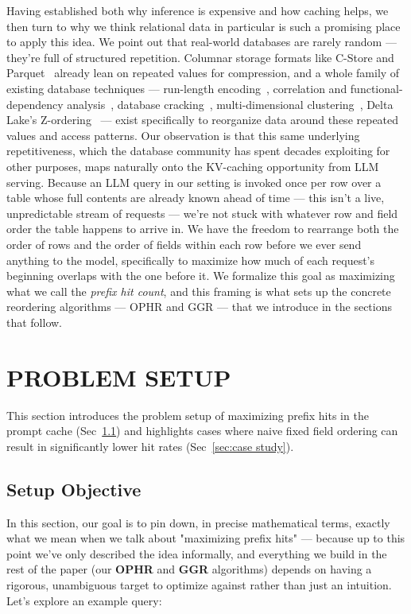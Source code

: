 \documentclass[manuscript,review]{acmart}
\begin{document}
Having established both why inference is expensive and how caching helps, we then turn to why we think relational data in particular is such a promising place to apply this idea. We point out that real-world databases are rarely random — they're full of structured repetition. Columnar storage formats like C-Store and Parquet~\cite{stonebraker2018cstore} already lean on repeated values for compression, and a whole family of existing database techniques — run-length encoding~\cite{lemire2011reordering}, correlation and functional-dependency analysis~\cite{dzeroski2003multirelational,ilyas2004cords}, database cracking~\cite{idreos2007cracking}, multi-dimensional clustering~\cite{chen2012multidimensional}, Delta Lake's Z-ordering~\cite{armbrust2020delta} — exist specifically to reorganize data around these repeated values and access patterns. Our observation is that this same underlying repetitiveness, which the database community has spent decades exploiting for other purposes, maps naturally onto the KV-caching opportunity from LLM serving. Because an LLM query in our setting is invoked once per row over a table whose full contents are already known ahead of time — this isn't a live, unpredictable stream of requests — we're not stuck with whatever row and field order the table happens to arrive in. We have the freedom to rearrange both the order of rows and the order of fields within each row before we ever send anything to the model, specifically to maximize how much of each request's beginning overlaps with the one before it. We formalize this goal as maximizing what we call the \textit{prefix hit count}, and this framing is what sets up the concrete reordering algorithms — OPHR and GGR — that we introduce in the sections that follow.
\section{PROBLEM SETUP}
This section introduces the problem setup of maximizing
prefix hits in the prompt cache (Sec~\ref{sec:setup}) and highlights cases
where naive fixed field ordering can result in significantly
lower hit rates (Sec~\ref{sec:case study}).
\subsection{Setup Objective}
\label{sec:setup}
In this section, our goal is to pin down, in precise mathematical terms, exactly what we mean when we talk about "maximizing prefix hits" — because up to this point we've only described the idea informally, and everything we build in the rest of the paper (our \textbf{OPHR} and \textbf{GGR} algorithms) depends on having a rigorous, unambiguous target to optimize against rather than just an intuition. Let's explore an example query:
\end{document}
